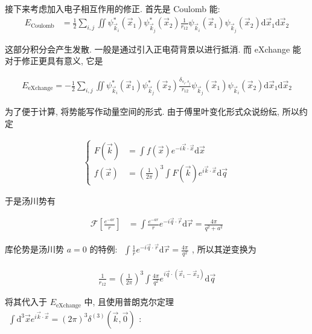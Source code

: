 \documentclass[../../main.tex]{subfiles}
\begin{document}
接下来考虑加入电子相互作用的修正. 首先是 Coulomb 能:
\begin{align*}
  E_{\text{Coulomb}} &= \frac{1}{2}\sum_{i,j}\iint
  \psi_{\vec{k}_{i}}^{*}(\vec{x}_{1})\psi_{\vec{k}_{j}}^{*}(\vec{x}_{2})
  \frac{1}{r_{12}}
  \psi_{\vec{k}_{i}}(\vec{x}_{1})\psi_{\vec{k}_{j}}(\vec{x}_{2})
  \mathrm{d}\vec{x}_{1}\mathrm{d}\vec{x}_{2}
\end{align*}

这部分积分会产生发散. 一般是通过引入正电荷背景以进行抵消. 而 eXchange 能对于修正更具有意义, 它是

\begin{align*}
  E_{\text{eXchange}} = -\frac{1}{2}\sum_{i,j}\iint
  \psi_{\vec{k}_{i}}^{*}(\vec{x}_{1})\psi_{\vec{k}_{j}}^{*}(\vec{x}_{2})
  \frac{\delta_{s_{i},s_{j}}}{r_{12}}
  \psi_{\vec{k}_{j}}(\vec{x}_{1})\psi_{\vec{k}_{i}}(\vec{x}_{2})
  \mathrm{d}\vec{x}_{1}\mathrm{d}\vec{x}_{2}
\end{align*}

为了便于计算, 将势能写作动量空间的形式. 由于傅里叶变化形式众说纷纭, 所以约定

\begin{align*}\left\{\begin{aligned}
  F(\vec{k}) &= \int f(\vec{x})e^{-i\vec{k}\cdot\vec{x}}\mathrm{d}\vec{x}\\
  f(\vec{x}) &= \left(\frac{1}{2\pi}\right)^{3}\int F(\vec{k})e^{i\vec{k}\cdot \vec{x}}\mathrm{d}\vec{q}
\end{aligned}
  \right.
\end{align*}

于是汤川势有

\begin{align*}
  \mathcal{F}\left[\frac{e^{-ar}}{r}\right] &= \int\frac{e^{-ar}}{r} e^{-i\vec{q}\cdot\vec{r}}\mathrm{d}\vec{r} = \frac{4\pi}{q^{2} + a^{2}}
\end{align*}

库伦势是汤川势 $a=0$ 的特例: $\begin{aligned}
  \int\frac{1}{r}e^{-i\vec{q}\cdot\vec{r}}\mathrm{d}\vec{r} = \frac{4\pi}{q^{2}}
\end{aligned}$, 所以其逆变换为

\begin{align*}
  \frac{1}{r_{12}} = \left(\frac{1}{2\pi}\right)^{3}\int\frac{4\pi}{q^{2}}e^{i\vec{q}\cdot(\vec{x}_{1}-\vec{x}_{2})}\mathrm{d}\vec{q}
\end{align*}

将其代入于 $E_{\text{eXchange}}$ 中, 且使用普朗克尔定理 $\begin{aligned}
  \int\mathrm{d}^{3}\vec{x}e^{i\vec{k}\cdot\vec{x}} = (2\pi)^{3}\delta^{(3)}(\vec{k},\vec{0})
\end{aligned}$:
\end{document}
